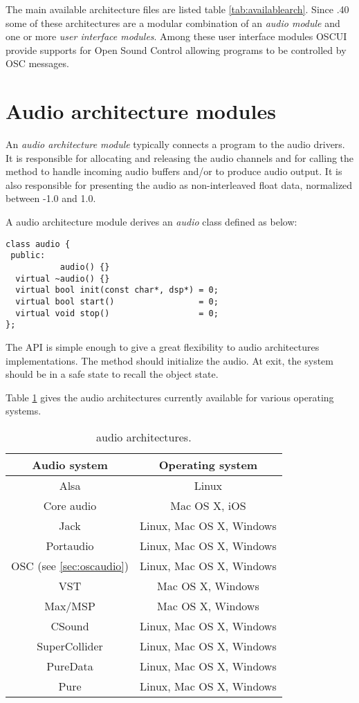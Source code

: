 The main available architecture files are listed table \ref{tab:availablearch}. Since .40 some of these architectures are a modular combination of an \emph{audio module} and one or more \emph{user interface modules}. Among these user interface modules OSCUI provide supports for Open Sound Control allowing \faust programs to be controlled by OSC messages. 

\section{Audio architecture modules} 
An \emph{audio architecture module} typically connects a \faust program to the audio drivers.
It is responsible for allocating and releasing the audio channels and for calling the \faust {} method to handle incoming audio buffers and/or to produce audio output. It is also responsible for presenting the audio as non-interleaved float data, normalized between -1.0 and 1.0.

A \faust audio architecture module derives an \emph{audio} class defined as below:
\begin{lstlisting}[basicstyle=\ttfamily\footnotesize\color{yotxt}]
class audio {
 public:
           audio() {}
  virtual ~audio() {}
  virtual bool init(const char*, dsp*) = 0;
  virtual bool start()                 = 0;
  virtual void stop()                  = 0;
};
\end{lstlisting} 


The API is simple enough to give a great flexibility to audio architectures implementations. The  method should initialize the audio. At  exit, the system should be in a safe state to recall the  object state.

Table \ref{tab:aarch} gives the audio architectures currently available for various operating systems.
\begin{table}[htdp]
\begin{center}
\begin{tabular}{|c|c|}
\hline
\bf{Audio system} & \bf{Operating system} \\
\hline
Alsa  & Linux \\
Core audio 		& Mac OS X, iOS \\
Jack 				& Linux, Mac OS X, Windows \\
Portaudio 			& Linux, Mac OS X, Windows \\
OSC {\footnotesize (see \ref{sec:oscaudio})} & Linux, Mac OS X, Windows \\
VST					& Mac OS X, Windows \\
Max/MSP				& Mac OS X, Windows \\
CSound				& Linux, Mac OS X, Windows \\
SuperCollider		& Linux, Mac OS X, Windows \\
PureData			& Linux, Mac OS X, Windows \\
Pure \cite{graef09}				& Linux, Mac OS X, Windows \\
\hline
\end{tabular}
\end{center}
\caption{\faust audio architectures.}
\label{tab:aarch}
\end{table}%
 


